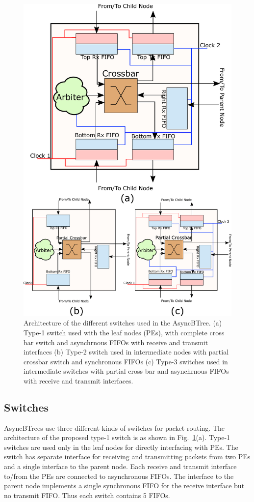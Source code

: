 \begin{figure}[t]
\centering
   \includegraphics[width=0.7\columnwidth]{Figures/switch1_2.pdf}
   \caption{Architecture of the different switches used in the AsyncBTree. (a) Type-1 switch used with the leaf nodes (PEs), with complete cross bar switch and asynchrnous 
   FIFOs with receive and transmit interfaces (b) Type-2 switch used in intermediate nodes with partial crossbar switch and synchronous FIFOs (c) Type-3 switches used in intermediate
   switches with partial cross bar and asynchrnous FIFOs with receive and transmit interfaces.}
   \label{fig:switchArch}
   \vspace{-5mm}
\end{figure}

\subsection{Switches}
\label{sec:switch}
AsyncBTrees use three different kinds of switches for packet routing.
The architecture of the proposed type-1 switch is as shown in Fig.~\ref{fig:switchArch}(a).
Type-1 switches are used only in the leaf nodes for directly interfacing with PEs.
The switch has separate interface for receiving and transmitting packets from two PEs and a single interface to the parent node.
Each receive and transmit interface to/from the PEs are connected to asynchronous FIFOs.
The interface to the parent node implements a single synchronous FIFO for the receive interface but no transmit FIFO.
Thus each switch contains 5 FIFOs.

